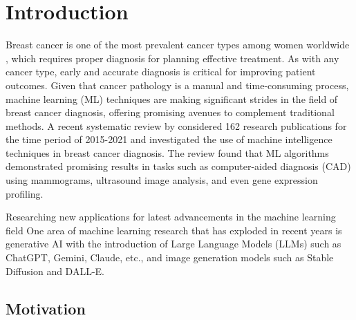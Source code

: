 

\chapter{Introduction}

\ifpdf
    \graphicspath{{1_introduction/figures/PNG/}{1_introduction/figures/PDF/}{1_introduction/figures/}}
\else
    \graphicspath{{1_introduction/figures/EPS/}{1_introduction/figures/}}
\fi


Breast cancer is one of the most prevalent cancer types among women worldwide \parencite{Sung2021GlobalCountries}, which requires proper diagnosis for planning effective treatment. As with any cancer type, early and accurate diagnosis is critical for improving patient outcomes. Given that cancer pathology is a manual and time-consuming process, machine learning (ML) techniques are making significant strides in the field of breast cancer diagnosis, offering promising avenues to complement traditional methods. A recent systematic review by \textcite{Nemade2022ATechniques} considered 162 research publications for the time period of 2015-2021 and investigated the use of machine intelligence techniques in breast cancer diagnosis. The review found that ML algorithms demonstrated promising results in tasks such as computer-aided diagnosis (CAD) using mammograms, ultrasound image analysis, and even gene expression profiling. 

Researching new applications for latest advancements in the machine learning field One area of machine learning research that has exploded in recent years is generative AI with the introduction of Large Language Models (LLMs) such as ChatGPT, Gemini, Claude, etc., and image generation models such as Stable Diffusion and DALL-E. 

\section{Motivation}

